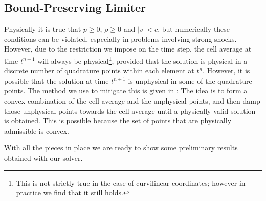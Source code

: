 \documentclass[letterpaper]{jpconf}
\begin{document}
%

\subsection{Bound-Preserving Limiter}
Physically it is true that $p\geq0$, $\rho\geq0$ and $\left|v\right|<c$, but numerically these conditions can be violated, especially in problems involving strong shocks. However, due to the restriction we impose on the time step, the cell average at time $t^{n+1}$ will always be physical\footnote{This is not strictly true in the case of curvilinear coordinates; however in practice we find that it still holds.}, provided that the solution is physical in a discrete number of quadrature points within each element at $t^{n}$. However, it is possible that the solution at time $t^{n+1}$ is unphysical in some of the quadrature points. The method we use to mitigate this is given in \cite{Qin2016}: The idea is to form a convex combination of the cell average and the unphysical points, and then damp those unphysical points towards the cell average until a physically valid solution is obtained. This is possible because the set of points that are physically admissible is convex.

With all the pieces in place we are ready to show some preliminary results obtained with our solver.
\end{document}
